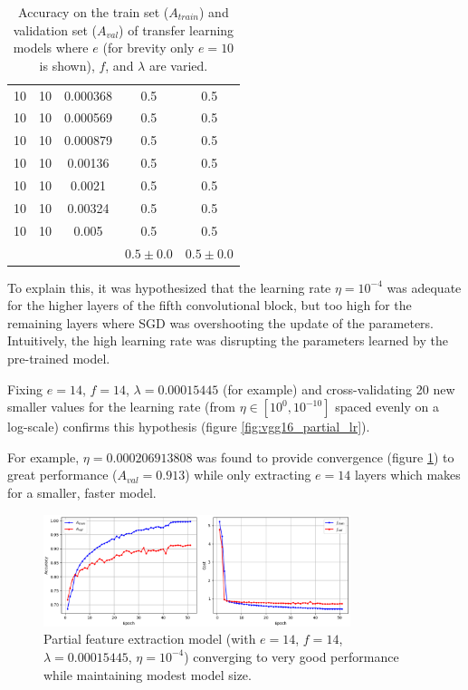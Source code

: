\begin{table}[ht]
\begin{tabular}{ |c|c|c|c|c| }
10 & 10 & 0.000368 & 0.5 & 0.5 \\
10 & 10 & 0.000569 & 0.5 & 0.5 \\
10 & 10 & 0.000879 & 0.5 & 0.5 \\
10 & 10 & 0.00136 & 0.5 & 0.5 \\
10 & 10 & 0.0021 & 0.5 & 0.5 \\
10 & 10 & 0.00324 & 0.5 & 0.5 \\
10 & 10 & 0.005 & 0.5 & 0.5 \\
\hline
 & & & $0.5\pm0.0$ & $0.5\pm0.0$ \\
\hline
\end{tabular}
    \caption{Accuracy on the train set ($A_{train}$) and validation set ($A_{val}$) of transfer learning models where $e$ (for brevity only $e = 10$ is shown), $f$, and $\lambda$ are varied.}
\label{table:vgg16_partial}
\end{table}

To explain this, it was hypothesized that the learning rate $\eta = 10^{-4}$ was adequate for the higher layers of the fifth convolutional block, but too high for the remaining layers where \ac{SGD} was overshooting the update of the parameters. Intuitively, the high learning rate was disrupting the parameters learned by the pre-trained model.

Fixing $e = 14$, $f = 14$, $\lambda = 0.00015445$ (for example) and cross-validating 20 new smaller values for the learning rate (from $\eta \in [10^0, 10^{-10}]$ spaced evenly on a log-scale) confirms this hypothesis (figure \ref{fig:vgg16_partial_lr}).

For example, $\eta = 0.000206913808$ was found to provide convergence (figure \ref{fig:vgg16_partial_convergence}) to great performance ($A_{val} = 0.913$) while only extracting $e = 14$ layers which makes for a smaller, faster model.

\begin{figure}[ht]
    \centering
    \includegraphics[width=0.8\textwidth]{figs/vgg16_partial_convergence.png}
    \caption{Partial feature extraction model (with $e = 14$, $f = 14$, $\lambda = 0.00015445$, $\eta = 10^{-4}$) converging to very good performance while maintaining modest model size.}
    \label{fig:vgg16_partial_convergence}
\end{figure}

